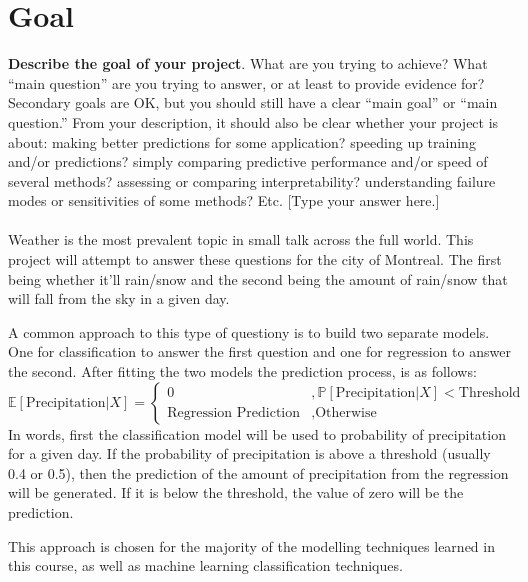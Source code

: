 \documentclass[a4paper,11pt]{article}
\newcommand{\E}{\mathbb{E}}
\newcommand{\prob}{\mathbb{P}}
\begin{document}
\newpage

\section{Goal}

\textbf{Describe the goal of your project}. What are you trying to achieve? What “main question” are you trying to answer, or at least to provide evidence for? Secondary goals are OK, but you should still have a clear “main goal” or “main question.” From your description, it should also be clear whether your project is about: making better predictions for some application? speeding up training and/or predictions? simply comparing predictive performance and/or speed of several methods? assessing or comparing interpretability? understanding failure modes or sensitivities of some methods? Etc.
[Type your answer here.]
\\
\\
Weather is the most prevalent topic in small talk across the full world. 
This project will attempt to answer these questions for the city of Montreal.  The first being whether it'll rain/snow and the second being the amount of rain/snow that will fall from the sky in a given day.\par
A common approach to this type of questiony is to build two separate models.  One for classification to answer the first question and one for regression to answer the second.  After fitting the two models the prediction process, is as follows:
$$
\E[\text{Precipitation}|X] =\left\{
        \begin{array}{ll}
            0 & ,\prob[\text{Precipitation}|X] < \text{Threshold}\\
            \text{Regression Prediction} &, \text{Otherwise}
        \end{array}
    \right.
$$
In words, first the classification model will be used to probability of precipitation for a given day.  If the probability of precipitation is above a threshold (usually 0.4 or 0.5), then the prediction of the amount of precipitation from the regression will be generated.  If it is below the threshold, the value of zero will be the prediction.\par
This approach is chosen for the majority of the modelling techniques learned in this course, as well as machine learning classification techniques.  


\newpage
\end{document}
